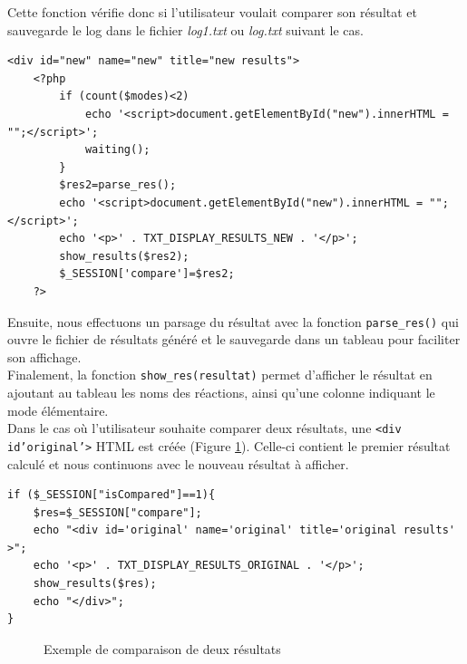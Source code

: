 Cette fonction vérifie donc si l'utilisateur voulait comparer son résultat et sauvegarde le log dans le fichier \emph{log1.txt} ou \emph{log.txt} suivant le cas.\\

\begin{DDbox}{\linewidth}
\begin{lstlisting}
<div id="new" name="new" title="new results">
	<?php
		if (count($modes)<2)
			echo '<script>document.getElementById("new").innerHTML = "";</script>';
			waiting();
		}
		$res2=parse_res();
		echo '<script>document.getElementById("new").innerHTML = "";</script>';
		echo '<p>' . TXT_DISPLAY_RESULTS_NEW . '</p>';
		show_results($res2);
		$_SESSION['compare']=$res2;
	?>		
\end{lstlisting}
\end{DDbox}

Ensuite, nous effectuons un parsage du résultat avec la fonction \texttt{parse\_res()} qui ouvre le fichier de résultats généré et le sauvegarde dans un tableau pour faciliter son affichage. \\
Finalement, la fonction \texttt{show\_res(resultat)} permet d'afficher le résultat en ajoutant au tableau les noms des réactions, ainsi qu'une colonne indiquant le mode élémentaire. \\
Dans le cas où l'utilisateur souhaite comparer deux résultats, une \texttt{<div id'original'>} HTML est créée (Figure \ref{comparaison}). Celle-ci contient le premier résultat calculé et nous continuons avec le nouveau résultat à afficher.\\

\begin{DDbox}{\linewidth}
\begin{lstlisting}
if ($_SESSION["isCompared"]==1){
	$res=$_SESSION["compare"];
	echo "<div id='original' name='original' title='original results' >";
	echo '<p>' . TXT_DISPLAY_RESULTS_ORIGINAL . '</p>';
	show_results($res);
	echo "</div>";
}
\end{lstlisting}
\end{DDbox}

\begin{figure}[!ht]
    \begin{center}
        		\caption{Exemple de comparaison de deux résultats}
          \label{comparaison}
      \end{center}   
\end{figure}

